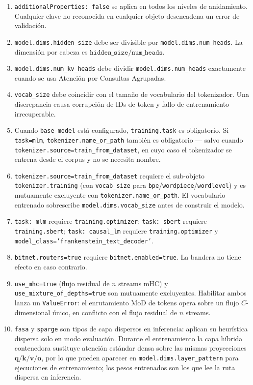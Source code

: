\begin{enumerate}[nosep]
    \item \texttt{additionalProperties: false} se aplica en todos los niveles de anidamiento. Cualquier clave no reconocida en cualquier objeto desencadena un error de validación.
    \item \texttt{model.dims.hidden\_size} debe ser divisible por \texttt{model.dims.num\_heads}. La dimensión por cabeza es $\texttt{hidden\_size} / \texttt{num\_heads}$.
    \item \texttt{model.dims.num\_kv\_heads} debe dividir \texttt{model.dims.num\_heads} exactamente cuando se usa Atención por Consultas Agrupadas.
    \item \texttt{vocab\_size} debe coincidir con el tamaño de vocabulario del tokenizador. Una discrepancia causa corrupción de IDs de token y fallo de entrenamiento irrecuperable.
    \item Cuando \texttt{base\_model} está configurado, \texttt{training.task} es obligatorio. Si \texttt{task=mlm}, \texttt{tokenizer.name\_or\_path} también es obligatorio --- salvo cuando \texttt{tokenizer.source=\allowbreak train\_from\_dataset}, en cuyo caso el tokenizador se entrena desde el corpus y no se necesita nombre.
    \item \texttt{tokenizer.source=\allowbreak train\_from\_dataset} requiere el sub-objeto \texttt{tokenizer.training} (con \texttt{vocab\_size} para \texttt{bpe}/\texttt{wordpiece}/\texttt{wordlevel}) y es mutuamente excluyente con \texttt{tokenizer.name\_or\_path}. El vocabulario entrenado sobrescribe \texttt{model.dims.vocab\_size} antes de construir el modelo.
    \item \texttt{task: mlm} requiere \texttt{training.optimizer}; \texttt{task: sbert} requiere \texttt{training.sbert}; \texttt{task: causal\_lm} requiere \texttt{training.optimizer} y \texttt{model\_class='frankenstein\_text\_decoder'}.
    \item \texttt{bitnet.routers=true} requiere \texttt{bitnet.enabled=true}. La bandera no tiene efecto en caso contrario.
    \item \texttt{use\_mhc=true} (flujo residual de $n$ streams mHC) y \texttt{use\_mixture\_of\_depths=true} son mutuamente excluyentes. Habilitar ambos lanza un \texttt{ValueError}: el enrutamiento MoD de tokens opera sobre un flujo $C$-dimensional único, en conflicto con el flujo residual de $n$ streams.
    \item \texttt{fasa} y \texttt{sparge} son tipos de capa dispersos en inferencia: aplican su heurística dispersa solo en modo evaluación. Durante el entrenamiento la capa híbrida contenedora sustituye atención estándar densa sobre las mismas proyecciones $\mathbf{q}/\mathbf{k}/\mathbf{v}/\mathbf{o}$, por lo que pueden aparecer en \texttt{model.dims.layer\_pattern} para ejecuciones de entrenamiento; los pesos entrenados son los que lee la ruta dispersa en inferencia.

\end{enumerate}
